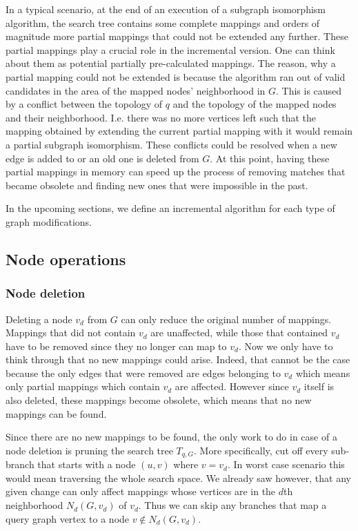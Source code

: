 In a typical scenario, at the end of an execution of a subgraph isomorphism algorithm,
the search tree contains some complete mappings and orders of magnitude more partial 
mappings that could not be extended any further. These partial mappings play a crucial 
role in the incremental version. One can think about them as potential partially 
pre-calculated mappings. The reason, why a partial mapping could not be extended is 
because the algorithm ran out of valid candidates in the area of the mapped nodes' 
neighborhood in \(G\). This is caused by a conflict between the topology of \(q\) and 
the topology of the mapped nodes and their neighborhood. I.e. there was no more vertices 
left such that the mapping obtained by extending the current partial mapping with it would 
remain a partial subgraph isomorphism. These conflicts could be resolved when a new edge is 
added to or an old one is deleted from \(G\). At this point, having these partial mappings 
in memory can speed up the process of removing  matches that became obsolete and finding new 
ones that were impossible in the past.

In the upcoming sections, we define an incremental algorithm for each type of graph 
modifications.

\subsection{Node operations}

\subsubsection{Node deletion}

Deleting a node $v_d$ from $G$ can only reduce the original number of mappings.
Mappings that did not contain $v_d$ are unaffected, while those that contained $v_d$ 
have to be removed since they no longer can map to $v_d$. Now we only have to think 
through that no new mappings could arise. Indeed, that cannot be the case because
the only edges that were removed are edges belonging to $v_d$ which means only 
partial mappings which contain $v_d$ are affected. However since $v_d$ itself is also
deleted, these mappings become obsolete, which means that no new mappings can be
found.

Since there are no new mappings to be found, the only work to do in case of a node
deletion is pruning the search tree $T_{q, G}$. More specifically, cut off every
sub-branch that starts with a node $(u, v)$ where $v = v_d$. In worst case scenario
this would mean traversing the whole search space. We already saw however, that any
given change can only affect mappings whose vertices are in the $d$th neighborhood
$N_d(G, v_d)$ of $v_d$. Thus we can skip any branches that map a query graph vertex
to a node $v \notin N_d(G, v_d)$.

